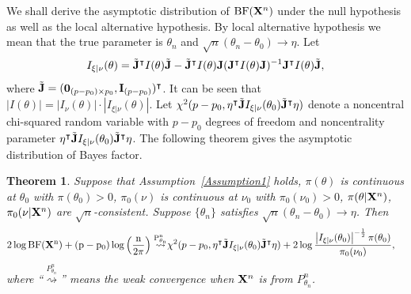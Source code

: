 \documentclass[11pt]{article}
\newcommand{\myT}{\intercal}
\theoremstyle{plain}
\newtheorem{theorem}{\quad\quad Theorem}
\theoremstyle{definition}
\theoremstyle{remark}
\begin{document}
We shall derive the asymptotic distribution of $\text{BF}(\mathbf{X}^n)$ under the null hypothesis as well as the local alternative hypothesis.
By local alternative hypothesis we mean that the true parameter is $\theta_n$ and $\sqrt{n}(\theta_n-\theta_0)\to \eta$.
Let
\begin{align*}
    I_{\xi|\nu}(\theta) = 
    \tilde \BJ ^\myT  I(\theta) \tilde \BJ
    -
    \tilde \BJ ^\myT  I(\theta) \BJ
    (  \BJ ^\myT  I(\theta) \BJ )^{-1}
    \BJ ^\myT  I(\theta) \tilde \BJ
    ,
\end{align*}
where
$\tilde\BJ=(\mathbf {0}_{ (p- p_0) \times p_0 },\BI_{(p-p_0)})^\myT $.
It can be seen that $|I(\theta)| = |I_{\nu}(\theta)|\cdot |I_{\xi | \nu}(\theta )|$.
Let $\chi^2(p-p_0,\eta^\myT\tilde \BJ I_{\xi|\nu}(\theta_0) \tilde\BJ^\myT\eta )$ denote a noncentral chi-squared random variable with $p-p_0$ degrees of freedom and noncentrality parameter $\eta^\myT\tilde \BJ I_{\xi|\nu}(\theta_0) \tilde\BJ^\myT\eta$.
The following theorem gives the asymptotic distribution of Bayes factor.

    \begin{theorem}
        Suppose that Assumption~\ref{Assumption1} holds, $\pi(\theta)$ is continuous at $\theta_0$ with $\pi(\theta_0)>0$, $\pi_0(\nu)$ is continuous at $\nu_0$ with $\pi_0(\nu_0)>0$, $\pi(\theta |\mathbf{X}^{n})$, $\pi_0(\nu|\mathbf{X}^{n})$ are $\sqrt{n}$-consistent.
        Suppose $\{\theta_n\}$ satisfies $\sqrt{n}(\theta_n-\theta_0)\to \eta$.
        Then 
\begin{align*}
    2 \log \rm{BF} (\BX^{n})
    +(p-p_0) \log \left( \frac{n}{2\pi} \right)
\overset{P^n_{\theta_n}}{\rightsquigarrow}
    &
    \chi^2 (p-p_0, \eta^\myT\tilde \BJ I_{\xi|\nu}(\theta_0) \tilde\BJ^\myT\eta )
    +
   2 \log
       \frac{
           \left|I_{\xi|\nu}(\theta_0)\right|^{-\frac 1 2}\pi(\theta_0) 
   }{
    \pi_0(\nu_0)
}
,
\end{align*}
where ``$\overset{P^n_{\theta_n}}{\rightsquigarrow}$'' means the weak convergence when $\mathbf{X}^n$ is from $P_{\theta_n}^n$.
\label{prop:expansion}
    \end{theorem}
\end{document}
